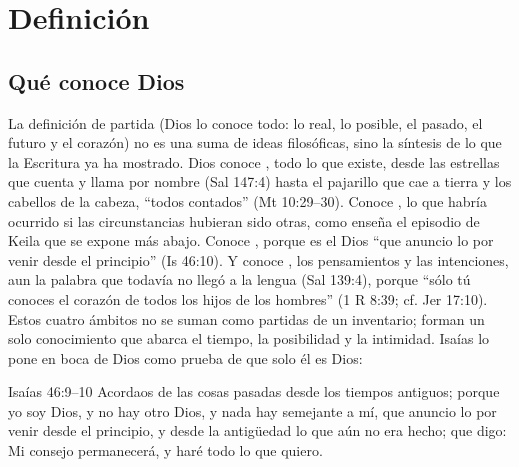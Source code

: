 
\section{Definición}

\subsection{Qué conoce Dios}
La definición de partida (Dios lo conoce todo: lo real, lo posible, el pasado, el futuro y el corazón) no es una suma de ideas filosóficas, sino la síntesis de lo que la Escritura ya ha mostrado. Dios conoce , todo lo que existe, desde las estrellas que cuenta y llama por nombre (Sal 147:4) hasta el pajarillo que cae a tierra y los cabellos de la cabeza, ``todos contados'' (Mt 10:29--30). Conoce , lo que habría ocurrido si las circunstancias hubieran sido otras, como enseña el episodio de Keila que se expone más abajo. Conoce , porque es el Dios ``que anuncio lo por venir desde el principio'' (Is 46:10). Y conoce , los pensamientos y las intenciones, aun la palabra que todavía no llegó a la lengua (Sal 139:4), porque ``sólo tú conoces el corazón de todos los hijos de los hombres'' (1 R 8:39; cf. Jer 17:10). Estos cuatro ámbitos no se suman como partidas de un inventario; forman un solo conocimiento que abarca el tiempo, la posibilidad y la intimidad. Isaías lo pone en boca de Dios como prueba de que solo él es Dios:

\begin{verso}{Isaías 46:9–10}
Acordaos de las cosas pasadas desde los tiempos antiguos; porque yo soy Dios, y no hay otro Dios, y nada hay semejante a mí, que anuncio lo por venir desde el principio, y desde la antigüedad lo que aún no era hecho; que digo: Mi consejo permanecerá, y haré todo lo que quiero.
\end{verso}

